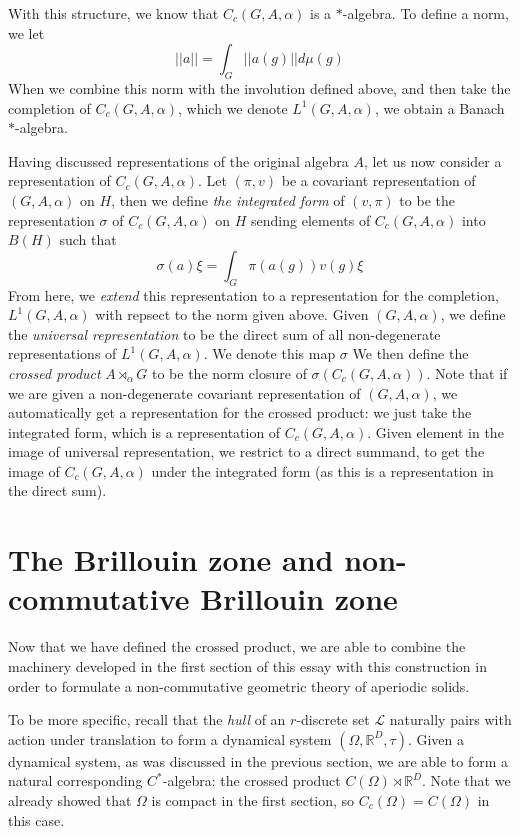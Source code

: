 \documentclass[aps,pra,showpacs,notitlepage,onecolumn,superscriptaddress,nofootinbib]{revtex4-1}
\theoremstyle{definition}
\newcommand{\hhrulefill}{\hspace{-1.5em} \hrulefill}
\begin{document}
With this structure, we know that $C_c(G, A, \alpha)$ is a $*$-algebra. To define a norm, we let
\begin{equation}
    ||a|| = \int_{G} ||a(g)|| d\mu(g)
\end{equation}
When we combine this norm with the involution defined above, and then take the completion of $C_c(G, A, \alpha)$, which we denote $L^1(G, A, \alpha)$, we obtain a Banach $*$-algebra.

Having discussed representations of the original algebra $A$, let us now consider a representation of $C_c(G, A, \alpha)$. Let $(\pi, v)$ be a covariant representation of $(G, A, \alpha)$ on $H$, 
then we define \emph{the integrated form} of $(v, \pi)$ to be the representation $\sigma$ of $C_c(G, A, \alpha)$ on $H$ sending elements of $C_c(G, A, \alpha)$ into $B(H)$ such that
\begin{equation}
    \sigma(a)\xi = \int_{G} \pi(a(g)) v(g) \xi 
\end{equation}
From here, we \emph{extend} this representation to a representation for the completion, $L^1(G, A, \alpha)$ with repsect to the norm given above. Given $(G, A, \alpha)$, we define 
the \emph{universal representation} to be the direct sum of all non-degenerate representations of $L^1(G, A, \alpha)$. We denote 
this map $\sigma$ We then define the \emph{crossed product} $A \rtimes_{\alpha} G$ to be the norm closure of $\sigma(C_c(G, A, \alpha))$. Note that if we are given a non-degenerate covariant 
representation of $(G, A, \alpha)$, we automatically get a representation for the crossed product: we just take the integrated form, which is a representation of $C_c(G, A, \alpha)$. Given 
element in the image of universal representation, we restrict to a direct summand, to get the image of $C_c(G, A, \alpha)$ under the integrated form (as this is a representation in the direct sum).

\hhrulefill

\section{The Brillouin zone and non-commutative Brillouin zone}

Now that we have defined the crossed product, we are able to combine the machinery developed in the first section of this essay with this construction in order 
to formulate a non-commutative geometric theory of aperiodic solids.

To be more specific, recall that the \emph{hull} of an $r$-discrete set $\mathcal{L}$ naturally pairs with action under translation to form a dynamical system $(\Omega, \mathbb{R}^{D}, \tau)$. Given a 
dynamical system, as was discussed in the previous section, we are able to form a natural corresponding $C^{*}$-algebra: the crossed product $C(\Omega) \rtimes \mathbb{R}^{D}$. Note that 
we already showed that $\Omega$ is compact in the first section, so $C_c(\Omega) = C(\Omega)$ in this case.
\newline
\end{document}
